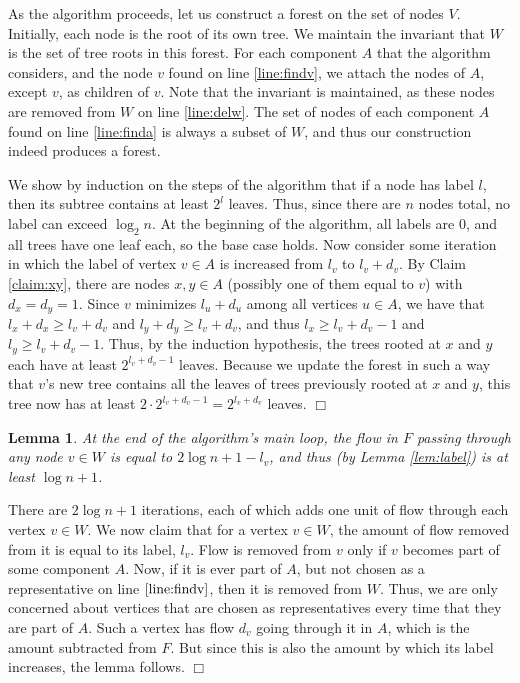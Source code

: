 \documentclass[11pt]{article}
\newcommand{\qed}{\hspace*{\fill}$\Box$}
\newtheorem{lemma}[theorem]{Lemma}
\newenvironment{proof}[1][Proof. ]{\noindent {\bf #1 }}{\qed}
\newenvironment{proofof}[1]{\medskip \noindent {\bf{Proof of #1. }}}{\qed}
\begin{document}
\begin{proofof}{Lemma \ref{lem:label}}
As the algorithm proceeds, let us construct a forest on the set of nodes $V$. Initially, each 
node is the root of its own tree. We maintain the invariant that $W$ is the set of tree roots 
in this forest. For each component $A$ that the algorithm considers, and the node $v$ found 
on line \ref{line:findv}, we attach the nodes of $A$, except $v$, as children of $v$. Note 
that the invariant is maintained, as these nodes are removed from $W$ on line \ref{line:delw}. 
The set of nodes of each component $A$ found on line \ref{line:finda} is always 
a subset of $W$, and thus our construction indeed produces a forest. 

We show by induction on the steps of the algorithm that if a node has label $l$, then its 
subtree contains at least $2^l$ leaves. Thus, since there are $n$ nodes total, no label can 
exceed $\log_2 n$. At the beginning of the algorithm, all labels are 0, and all trees have 
one leaf each, so the base case holds. Now consider some iteration in which the label of 
vertex $v\in A$ is increased from $l_v$ to $l_v + d_v$. By Claim  \ref{claim:xy}, there are 
nodes $x,y\in A$ (possibly one of them equal to $v$) with $d_x=d_y=1$. Since $v$ minimizes 
$l_u+d_u$ among all vertices  $u\in A$, we have that $l_x + d_x \geq l_v+d_v$ and 
$l_y + d_y \geq l_v+d_v$, and thus $l_x \geq l_v+d_v -1$ and $l_y \geq l_v+d_v -1$. 
Thus, by the induction hypothesis, the trees rooted at $x$ and $y$ each have at least 
$2^{l_v+d_v-1}$ leaves. Because we update the forest in such a way that $v$'s new tree 
contains all the leaves of trees previously rooted at $x$ and $y$, this tree now has at 
least $2\cdot 2^{l_v+d_v-1} = 2^{l_v+d_v}$ leaves. 
\end{proofof}



\begin{lemma} \label{lem:amtflow}
At the end of the algorithm's main loop, the flow in $F$ passing through any node $v\in W$ 
is equal to $2\log n + 1 - l_v$, and thus (by Lemma \ref{lem:label}) is at least $\log n +1$.
\end{lemma}
\begin{proof}
There are $2\log n + 1$ iterations, each of which adds one unit of flow through each vertex $v\in W$. 
We now claim that for a vertex $v\in W$, the amount of flow removed from it is equal to its label, 
$l_v$. Flow is removed from $v$ only if $v$ becomes part of some component $A$. Now, if it is ever 
part of $A$, but not chosen as a representative on line $\ref{line:findv}$, then it is removed 
from $W$. Thus, we are only concerned about vertices that are chosen as representatives every 
time that  they are  part of $A$. Such a vertex has flow $d_v$ going through it in $A$, which 
is the amount subtracted from $F$. But since this is also the amount by which its label increases, 
the lemma follows.
\end{proof}
\end{document}
